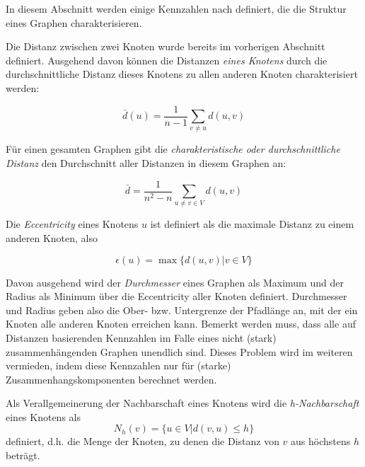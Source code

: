 In diesem Abschnitt werden einige Kennzahlen nach
\cite{Brinkmeier2004} definiert, die die Struktur eines Graphen
charakterisieren.

Die Distanz zwischen zwei Knoten wurde bereits im vorherigen Abschnitt
definiert. Ausgehend davon k\"onnen die Distanzen \emph{eines Knotens}
durch die durchschnittliche Distanz dieses Knotens zu allen anderen
Knoten charakterisiert werden:

\begin{equation}
  \label{eq:1}
  \bar{d}(u) = \frac{1}{n-1} \sum_{v \ne u} d(u, v)
\end{equation}

F\"ur einen gesamten Graphen gibt die \emph{charakteristische oder
  durchschnittliche Distanz} den Durchschnitt aller Distanzen in
diesem Graphen an:

\begin{equation}
  \label{eq:2}
  \bar{d} = \frac{1}{n^2 - n} \sum_{u \ne v \in V} d(u, v)
\end{equation}

Die \emph{Eccentricity} eines Knotens $u$ ist definiert als die
maximale Distanz zu einem anderen Knoten, also

\begin{equation}
  \label{eq:3}
  \epsilon(u) = \max\{d(u,v) | v \in V\}
\end{equation}

Davon ausgehend  wird der \emph{Durchmesser} eines Graphen als Maximum
und der Radius als Minimum \"uber die Eccentricity aller Knoten
definiert. Durchmesser und Radius geben also die Ober-
bzw. Untergrenze der Pfadl\"ange an, mit der ein Knoten alle anderen
Knoten erreichen kann. Bemerkt werden muss, dass alle auf Distanzen
basierenden Kennzahlen im Falle eines nicht (stark)
zusammenh\"angenden Graphen unendlich sind. Dieses Problem wird im
weiteren vermieden, indem diese Kennzahlen nur f\"ur (starke)
Zusammenhangskomponenten berechnet werden.

Als Verallgemeinerung der Nachbarschaft eines Knotens wird die
\emph{h-Nachbarschaft} eines Knotens als
\begin{equation}
  \label{eq:4}
  N_h(v) = \{ u \in V | d(v, u) \le h \}
\end{equation}
definiert, d.h. die Menge der Knoten, zu denen die Distanz von $v$ aus
h\"ochstens $h$ betr\"agt.

